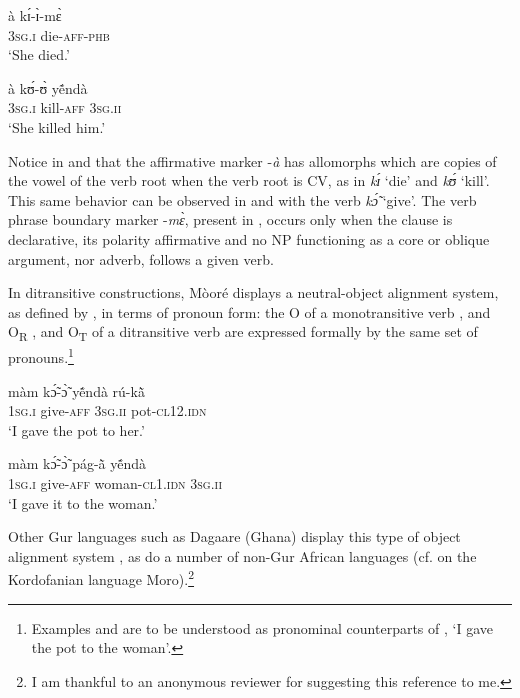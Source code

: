 \documentclass[output=paper]{langsci/langscibook}
\begin{document}
\ea
\label{ex:10.pacchiarotti}
\gll à    kɪ́-ɪ̀-mɛ̀      \\     
\textsc{3sg.i} die-\textsc{aff-phb} \\
\glt`She died.'
\z 

\ea
\label{ex:11.pacchiarotti}
\gll à    kʊ́-ʊ̀    yẽ́ndà\\
\textsc{3sg.i}    kill-\textsc{aff}  \textsc{3sg.ii}\\
\glt`She killed him.'
\z

Notice in  and  that the affirmative marker -\textit{à} has allomorphs which are copies of the vowel of the verb root when the verb root is CV, as in \textit{kɪ́} `die' and \textit{kʊ́} `kill'. This same behavior can be observed in  and  with the verb \textit{k\'{\~{ɔ}}} `give'. The verb phrase boundary marker -\textit{mɛ̀}, present in , occurs only when the clause is declarative, its polarity affirmative and no NP functioning as a core or oblique argument, nor adverb, follows a given verb.  

In ditransitive constructions, Mòoré displays a neutral-object alignment system, as defined by \citet{malchukovetal2010}, in terms of pronoun form: the O of a monotransitive verb , and O\textsubscript{R} , and O\textsubscript{T}  of a ditransitive verb are expressed formally by the same set of pronouns.\footnote{Examples  and  are to be understood as pronominal counterparts of , `I gave the pot to the woman'.} 

\ea
\label{ex:12.pacchiarotti}
\gll màm    kɔ̃́-ɔ̃̀      y\'{ẽ}ndà    rú-k\`{ã}\\
\textsc{1sg.i}    give-\textsc{aff}    \textsc{3sg.ii}    pot\textsc{-cl12.idn} \\
\glt `I gave the pot to her.'
\z

\ea
\label{ex:13.pacchiarotti}
\gll màm    kɔ̃́-ɔ̃̀    pág-\`{ã}      y\'{ẽ}ndà\\
\textsc{1sg.i}    give-\textsc{aff}  woman-\textsc{cl1.idn}  \textsc{3sg.ii} \\
\glt `I gave it to the woman.'
\z

Other Gur languages such as Dagaare (Ghana) display this type of object alignment system \citep{bodomo1997}, as do a number of non-Gur African languages (cf. \citealt{ackermanetaltoappear} on the Kordofanian language Moro).\footnote{I am thankful to an anonymous reviewer for suggesting this reference to me.}
\end{document}
